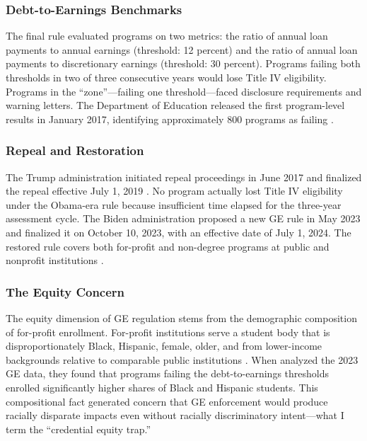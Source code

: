 \documentclass[12pt]{article}
\begin{document}
\subsubsection*{Debt-to-Earnings Benchmarks} The final rule evaluated programs on two metrics: the ratio of annual loan payments to annual earnings (threshold: 12 percent) and the ratio of annual loan payments to discretionary earnings (threshold: 30 percent). Programs failing both thresholds in two of three consecutive years would lose Title IV eligibility. Programs in the ``zone''---failing one threshold---faced disclosure requirements and warning letters. The Department of Education released the first program-level results in January 2017, identifying approximately 800 programs as failing \citep{DOE2017}.

\subsubsection*{Repeal and Restoration} The Trump administration initiated repeal proceedings in June 2017 and finalized the repeal effective July 1, 2019 \citep{FederalRegister2019}. No program actually lost Title IV eligibility under the Obama-era rule because insufficient time elapsed for the three-year assessment cycle. The Biden administration proposed a new GE rule in May 2023 and finalized it on October 10, 2023, with an effective date of July 1, 2024. The restored rule covers both for-profit and non-degree programs at public and nonprofit institutions \citep{FederalRegister2023}.

\subsubsection*{The Equity Concern} The equity dimension of GE regulation stems from the demographic composition of for-profit enrollment. For-profit institutions serve a student body that is disproportionately Black, Hispanic, female, older, and from lower-income backgrounds relative to comparable public institutions \citep{DemingGoldinKatz2012, BaumSandy2017}. When \citet{TICAS2023} analyzed the 2023 GE data, they found that programs failing the debt-to-earnings thresholds enrolled significantly higher shares of Black and Hispanic students. This compositional fact generated concern that GE enforcement would produce racially disparate impacts even without racially discriminatory intent---what I term the ``credential equity trap.''
\end{document}
